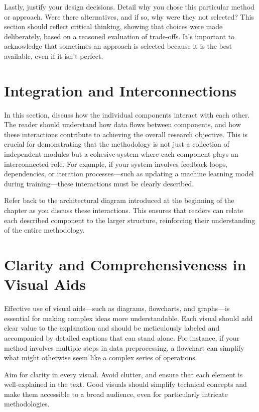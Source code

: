 \documentclass{iutbscthesis}
\begin{document}
Lastly, justify your design decisions. Detail why you chose this particular method or approach. Were there alternatives, and if so, why were they not selected? This section should reflect critical thinking, showing that choices were made deliberately, based on a reasoned evaluation of trade-offs. It's important to acknowledge that sometimes an approach is selected because it is the best available, even if it isn't perfect.

\section{Integration and Interconnections}

In this section, discuss how the individual components interact with each other. The reader should understand how data flows between components, and how these interactions contribute to achieving the overall research objective. This is crucial for demonstrating that the methodology is not just a collection of independent modules but a cohesive system where each component plays an interconnected role. For example, if your system involves feedback loops, dependencies, or iteration processes—such as updating a machine learning model during training—these interactions must be clearly described.

Refer back to the architectural diagram introduced at the beginning of the chapter as you discuss these interactions. This ensures that readers can relate each described component to the larger structure, reinforcing their understanding of the entire methodology.

\section{Clarity and Comprehensiveness in Visual Aids}

Effective use of visual aids—such as diagrams, flowcharts, and graphs—is essential for making complex ideas more understandable. Each visual should add clear value to the explanation and should be meticulously labeled and accompanied by detailed captions that can stand alone. For instance, if your method involves multiple steps in data preprocessing, a flowchart can simplify what might otherwise seem like a complex series of operations.

Aim for clarity in every visual. Avoid clutter, and ensure that each element is well-explained in the text. Good visuals should simplify technical concepts and make them accessible to a broad audience, even for particularly intricate methodologies.
\end{document}
